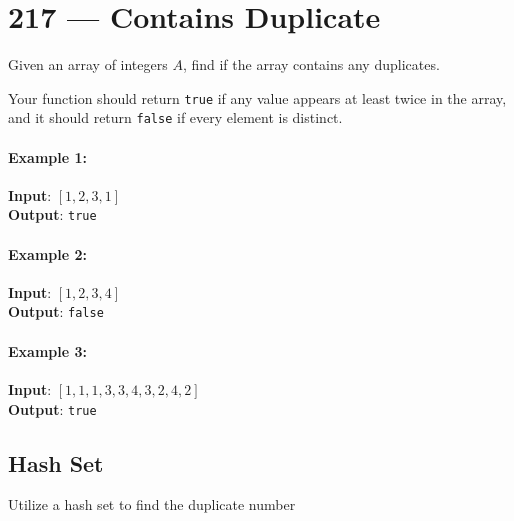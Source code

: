 \section{217 --- Contains Duplicate}
Given an array of integers $A$, find if the array contains any duplicates.
\par
Your function should return \texttt{true} if any value appears at least twice in the array, and it should return \texttt{false} if every element is distinct.

\paragraph{Example 1:}
\begin{flushleft}
\textbf{Input}: $[1,2,3,1]$
\\
\textbf{Output}: \texttt{true}
\end{flushleft}

\paragraph{Example 2:}
\begin{flushleft}
\textbf{Input}: $[1,2,3,4]$
\\
\textbf{Output}: \texttt{false}
\end{flushleft}

\paragraph{Example 3:}
\begin{flushleft}
\textbf{Input}: $[1,1,1,3,3,4,3,2,4,2]$
\\
\textbf{Output}: \texttt{true}
\end{flushleft}
\subsection{Hash Set}
Utilize a hash set to find the duplicate number
